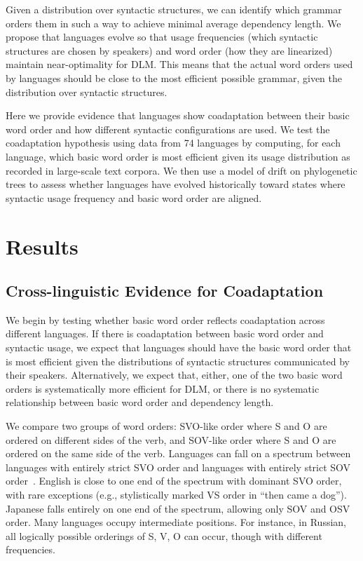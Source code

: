 \documentclass[9pt,twocolumn,twoside,lineno]{pnas-new}
\begin{document}
Given a distribution over syntactic structures, we can identify which grammar orders them in such a way to achieve minimal average dependency length.
We propose that languages evolve so that usage frequencies (which syntactic structures are chosen by speakers) and word order (how they are linearized) maintain near-optimality for DLM.
This means that the actual word orders used by languages should be close to the most efficient possible grammar, given the distribution over syntactic structures.

Here we provide evidence that languages show coadaptation between their basic word order and how different syntactic configurations are used.
We test the coadaptation hypothesis using data from 74 languages by computing, for each language, which basic word order is most efficient given its usage distribution as recorded in large-scale text corpora.
We then use a model of drift on phylogenetic trees to assess whether languages have evolved historically toward states where syntactic usage frequency and basic word order are aligned.



\section*{Results}

\subsection*{Cross-linguistic Evidence for Coadaptation}

We begin by testing whether basic word order reflects coadaptation across different languages.
If there is coadaptation between basic word order and syntactic usage, we expect that languages should have the basic word order that is most efficient given the distributions of syntactic structures communicated by their speakers.
Alternatively, we expect that, either, one of the two basic word orders is systematically more efficient for DLM, or there is no systematic relationship between basic word order and dependency length.


We compare two groups of word orders: SVO-like order where S and O are ordered on different sides of the verb, and SOV-like order where S and O are ordered on the same side of the verb.
Languages can fall on a spectrum between languages with entirely strict SVO order and languages with entirely strict SOV order~\citep{steele1978word}.
English is close to one end of the spectrum with dominant SVO order, with rare exceptions (e.g., stylistically marked VS order in ``then came a dog'').
Japanese falls entirely on one end of the spectrum, allowing only SOV and OSV order.
Many languages occupy intermediate positions. 
For instance, in Russian, all logically possible orderings of S, V, O can occur, though with different frequencies.
\end{document}
